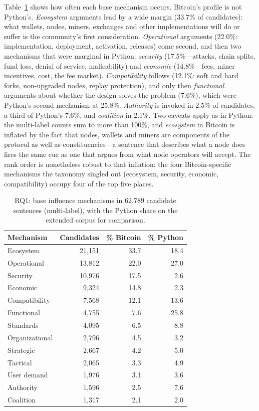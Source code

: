 Table~\ref{tab:rq1} shows how often each base mechanism occurs. Bitcoin's profile is not Python's. \emph{Ecosystem} arguments lead by a wide margin (33.7\% of candidates): what wallets, nodes, miners, exchanges and other implementations will do or suffer is the community's first consideration. \emph{Operational} arguments (22.0\%: implementation, deployment, activation, releases) come second, and then two mechanisms that were marginal in Python: \emph{security} (17.5\%---attacks, chain splits, fund loss, denial of service, malleability) and \emph{economic} (14.8\%---fees, miner incentives, cost, the fee market). \emph{Compatibility} follows (12.1\%: soft and hard forks, non-upgraded nodes, replay protection), and only then \emph{functional} arguments about whether the design solves the problem (7.6\%), which were Python's second mechanism at 25.8\%. \emph{Authority} is invoked in 2.5\% of candidates, a third of Python's 7.6\%, and \emph{coalition} in 2.1\%. Two caveats apply as in Python: the multi-label counts sum to more than 100\%, and \emph{ecosystem} in Bitcoin is inflated by the fact that nodes, wallets and miners are components of the protocol as well as constituencies---a sentence that describes what a node does fires the same cue as one that argues from what node operators will accept. The rank order is nonetheless robust to that inflation: the four Bitcoin-specific mechanisms the taxonomy singled out (ecosystem, security, economic, compatibility) occupy four of the top five places.

\begin{table}[t]
\caption{RQ1: base influence mechanisms in 62,789 candidate sentences (multi-label), with the Python share on the extended corpus for comparison.}
\label{tab:rq1}
\small
\begin{tabular}{lrrr}
\toprule
Mechanism & Candidates & \% Bitcoin & \% Python \\
\midrule
Ecosystem & 21,151 & 33.7 & 18.4 \\
Operational & 13,812 & 22.0 & 27.0 \\
Security & 10,976 & 17.5 & 2.6 \\
Economic & 9,324 & 14.8 & 2.3 \\
Compatibility & 7,568 & 12.1 & 13.6 \\
Functional & 4,755 & 7.6 & 25.8 \\
Standards & 4,095 & 6.5 & 8.8 \\
Organizational & 2,796 & 4.5 & 3.2 \\
Strategic & 2,667 & 4.2 & 5.0 \\
Tactical & 2,065 & 3.3 & 4.9 \\
User demand & 1,976 & 3.1 & 3.6 \\
Authority & 1,596 & 2.5 & 7.6 \\
Coalition & 1,317 & 2.1 & 2.0 \\
\bottomrule
\end{tabular}
\end{table}

